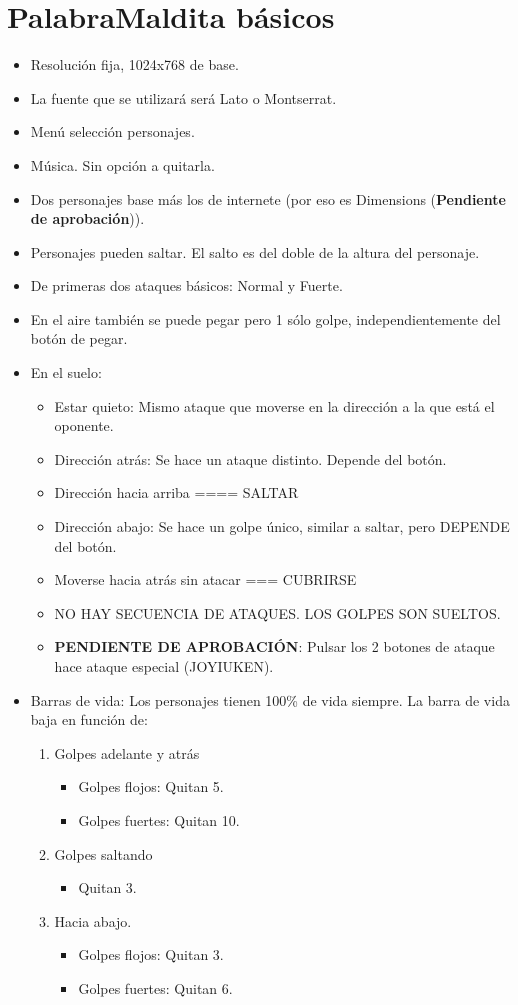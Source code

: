\documentclass[10pt,a4paper,titlepage]{article}
\begin{document}
\section{PalabraMaldita básicos}
\begin{itemize}
	\item Resolución fija, 1024x768 de base.
	\item La fuente que se utilizará será Lato o Montserrat.
	\item Menú selección personajes.
	\item Música. Sin opción a quitarla.
	\item Dos personajes base más los de internete (por eso es Dimensions (\textbf{Pendiente de aprobación})).
	\item Personajes pueden saltar. El salto es del doble de la altura del personaje.
	\item De primeras dos ataques básicos: Normal y Fuerte.
	\item En el aire también se puede pegar pero 1 sólo golpe, independientemente del botón de pegar.
	\item En el suelo:
	\begin{itemize}
		\item Estar quieto: Mismo ataque que moverse en la dirección a la que está el oponente.
		\item Dirección atrás: Se hace un ataque distinto. Depende del botón.
		\item Dirección hacia arriba ==== SALTAR
		\item Dirección abajo: Se hace un golpe único, similar a saltar, pero DEPENDE del botón.
		\item Moverse hacia atrás sin atacar === CUBRIRSE
		\item NO HAY SECUENCIA DE ATAQUES. LOS GOLPES SON SUELTOS.
		\item \textbf{PENDIENTE DE APROBACIÓN}: Pulsar los 2 botones de ataque hace ataque especial (JOYIUKEN).
	\end{itemize}

	\item Barras de vida: Los personajes tienen 100\% de vida siempre. La barra de vida baja en función de:
	\begin{enumerate}
		\item Golpes adelante y atrás
		\begin{itemize}
			\item Golpes flojos: Quitan 5. 
			\item Golpes fuertes: Quitan 10.
		\end{itemize}
		\item Golpes saltando
		\begin{itemize}
			\item Quitan 3.
		\end{itemize} 
		\item Hacia abajo.
		\begin{itemize}
			\item Golpes flojos: Quitan 3. 
			\item Golpes fuertes: Quitan 6.
		\end{itemize}
	\end{enumerate}


\end{itemize}
\end{document}
